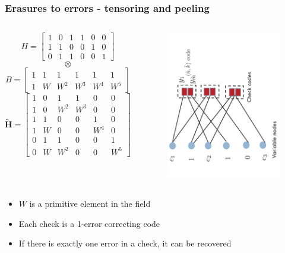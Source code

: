 \begin{frame}\frametitle{Erasures to errors - tensoring and peeling}
\begin{columns}
    \small
    \[
    H = \left[
    \begin{array}{ccccccc}
    1&0&1&1&0&0\\
    1&1&0&0&1&0 \\
    0&1&1&0&0&1
    \end{array}
    \right]
    \]
    \[
    \otimes
    \]
    \[
    B = \left[
    \begin{array}{ccccccc}
    1&1&1&1&1&1\\
    1&W&W^2&W^3&W^4&W^5
    \end{array}
    \right]
    \]
    \[
    \mathbf{\tilde{H}} = \left[
    \begin{array}{ccccccc}
    1&0&1&1&0&0\\
    1&0&W^2&W^3&0&0\\
    1&1&0&0&1&0 \\
    1&W&0&0&W^4&0 \\
    0&1&1&0&0&1 \\
    0&W&W^2&0&0&W^5
    \end{array}
    \right]
    \]
    \begin{figure}[t]
    \centering
    \includegraphics[width=2.0in,angle=-90]{./Figures/GLDPC}
    \end{figure}
\end{columns}
\begin{block}{}
\begin{itemize}
\item $W$ is a primitive element in the field
\item Each check is a 1-error correcting code
\item If there is exactly one error in a check, it can be recovered
\end{itemize}
\end{block}
\end{frame}
